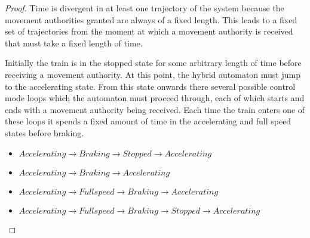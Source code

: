 \begin{mytheorem}
\begin{proof}
Time is divergent in at least one trajectory of the system because the movement authorities granted are always of a fixed length. This leads to a fixed set of trajectories from the moment at which a movement authority is received that must take a fixed length of time.

Initially the train is in the stopped state for some arbitrary length of time before receiving a movement authority. At this point, the hybrid automaton must jump to the accelerating state. From this state onwards there several possible control mode loops which the automaton must proceed through, each of which starts and ends with a movement authority being received. Each time the train enters one of these loops it spends a fixed amount of time in the accelerating and full speed states before braking.

\begin{itemize}
\item $Accelerating \to Braking \to Stopped \to Accelerating $
\item $Accelerating \to Braking \to Accelerating$
\item $Accelerating \to Full speed \to Braking \to Accelerating$
\item $Accelerating \to Full speed \to Braking \to Stopped \to Accelerating$
\end{itemize}


\end{proof}
\end{mytheorem}





